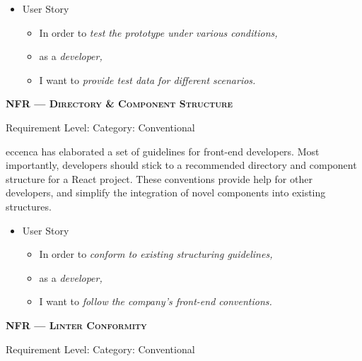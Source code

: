 \newpage

\begin{itemize}[after=\vspace{1em}]
    \setlength\itemsep{-0.5em}
	\item[] User Story\\[-7.8mm]
	\begin{itemize}
    \setlength\itemsep{-0.5em}
        \item[] In order to \textit{test the prototype under various conditions,}
        \item[] as a \textit{developer,}
        \item[] I want to \textit{provide test data for different scenarios.}
    \end{itemize}
\end{itemize}






\centerline{\textbf{NFR\textsubscript{} --- \textsc{Directory \& Component Structure}}}
\centerline{\small Requirement Level:  \quad{} Category: Conventional}

\noindent eccenca has elaborated a set of guidelines for front-end developers. Most importantly, developers should stick to a recommended directory and component structure for a React project. These conventions provide help for other developers, and simplify the integration of novel components into existing structures.


\begin{itemize}[after=\vspace{1em}]
    \setlength\itemsep{-0.5em}
	\item[] User Story\\[-7.8mm]
	\begin{itemize}
    \setlength\itemsep{-0.5em}
        \item[] In order to \textit{conform to existing structuring guidelines,}
        \item[] as a \textit{developer,}
        \item[] I want to \textit{follow the company’s front-end conventions.}
    \end{itemize}
\end{itemize}




\centerline{\textbf{NFR\textsubscript{} --- \textsc{Linter Conformity}}}
\centerline{\small Requirement Level:  \quad{} Category: Conventional}

